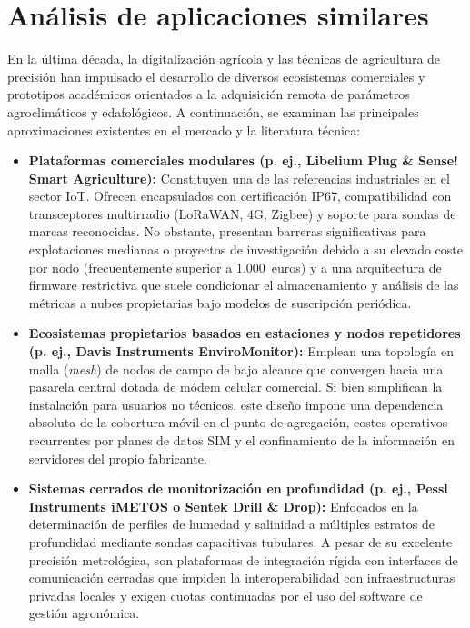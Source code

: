 \section{Análisis de aplicaciones similares}

En la última década, la digitalización agrícola y las técnicas de agricultura de precisión han impulsado el desarrollo de diversos ecosistemas comerciales y prototipos académicos orientados a la adquisición remota de parámetros agroclimáticos y edafológicos. A continuación, se examinan las principales aproximaciones existentes en el mercado y la literatura técnica:

\begin{itemize}
    \item \textbf{Plataformas comerciales modulares (p. ej., Libelium Plug \& Sense! Smart Agriculture):} Constituyen una de las referencias industriales en el sector IoT. Ofrecen encapsulados con certificación IP67, compatibilidad con transceptores multirradio (LoRaWAN, 4G, Zigbee) y soporte para sondas de marcas reconocidas. No obstante, presentan barreras significativas para explotaciones medianas o proyectos de investigación debido a su elevado coste por nodo (frecuentemente superior a 1.000~euros) y a una arquitectura de firmware restrictiva que suele condicionar el almacenamiento y análisis de las métricas a nubes propietarias bajo modelos de suscripción periódica.

    \item \textbf{Ecosistemas propietarios basados en estaciones y nodos repetidores (p. ej., Davis Instruments EnviroMonitor):} Emplean una topología en malla (\textit{mesh}) de nodos de campo de bajo alcance que convergen hacia una pasarela central dotada de módem celular comercial. Si bien simplifican la instalación para usuarios no técnicos, este diseño impone una dependencia absoluta de la cobertura móvil en el punto de agregación, costes operativos recurrentes por planes de datos SIM y el confinamiento de la información en servidores del propio fabricante.

    \item \textbf{Sistemas cerrados de monitorización en profundidad (p. ej., Pessl Instruments iMETOS o Sentek Drill \& Drop):} Enfocados en la determinación de perfiles de humedad y salinidad a múltiples estratos de profundidad mediante sondas capacitivas tubulares. A pesar de su excelente precisión metrológica, son plataformas de integración rígida con interfaces de comunicación cerradas que impiden la interoperabilidad con infraestructuras privadas locales y exigen cuotas continuadas por el uso del software de gestión agronómica.


\end{itemize}
